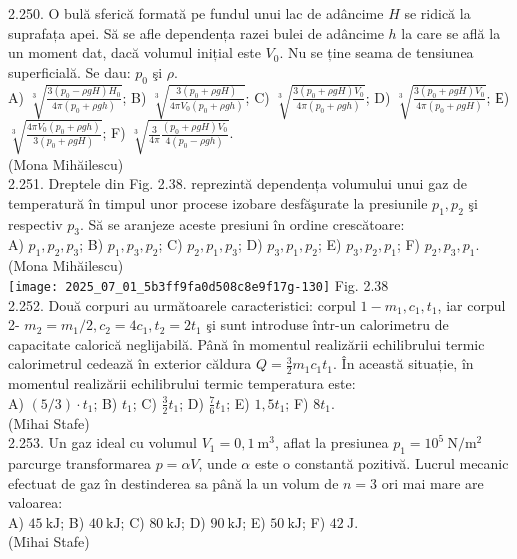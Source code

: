 2.250. O bulă sferică formată pe fundul unui lac de adâncime $H$ se ridică la suprafața apei. Să se afle dependența razei bulei de adâncime $h$ la care se află la un moment dat, dacă volumul inițial este $V_{0}$. Nu se ține seama de tensiunea superficială. Se dau: $p_{0}$ şi $\rho$.\\ A) $\sqrt[3]{\frac{3\left(p_{0}-\rho g H\right) H_{0}}{4 \pi\left(p_{0}+\rho g h\right)}}$; B) $\sqrt[3]{\frac{3\left(p_{0}+\rho g H\right)}{4 \pi V_{0}\left(p_{0}+\rho g h\right)}}$; C) $\sqrt[3]{\frac{3\left(p_{0}+\rho g H\right) V_{0}}{4 \pi\left(p_{0}+\rho g h\right)}}$; D) $\sqrt[3]{\frac{3\left(p_{0}+\rho g H\right) V_{0}}{4 \pi\left(p_{0}+\rho g H\right)}}$; Е) $\sqrt[3]{\frac{4 \pi V_{0}\left(p_{0}+\rho g h\right)}{3\left(p_{0}+\rho g H\right)}}$; F) $\sqrt[3]{\frac{3}{4 \pi} \frac{\left(p_{0}+\rho g H\right) V_{0}}{4\left(p_{0}-\rho g h\right)}}$.\\ (Mona Mihăilescu)\\

2.251. Dreptele din Fig. 2.38. reprezintă dependența volumului unui gaz de temperatură în timpul unor procese izobare desfăşurate la presiunile $p_{1}, p_{2}$ şi respectiv $p_{3}$. Să se aranjeze aceste presiuni în ordine crescătoare:\\ A) $p_{1}, p_{2}, p_{3}$; B) $p_{1}, p_{3}, p_{2}$; C) $p_{2}, p_{1}, p_{3}$; D) $p_{3}, p_{1}, p_{2}$; E) $p_{3}, p_{2}, p_{1}$; F) $p_{2}, p_{3}, p_{1}$.\\ (Mona Mihăilescu)\\ \texttt{[image: 2025\_07\_01\_5b3ff9fa0d508c8e9f17g-130]} Fig. 2.38\\

2.252. Două corpuri au următoarele caracteristici: corpul $1-m_{1}, c_{1}, t_{1}$, iar corpul 2- $m_{2}=m_{1} / 2, c_{2}=4 c_{1}, t_{2}=2 t_{1}$ şi sunt introduse într-un calorimetru de capacitate calorică neglijabilă. Până în momentul realizării echilibrului termic calorimetrul cedează în exterior căldura $Q=\frac{3}{2} m_{1} c_{1} t_{1}$. În această situație, în momentul realizării echilibrului termic temperatura este:\\ A) $(5 / 3) \cdot t_{1}$; B) $t_{1}$; C) $\frac{3}{2} t_{1}$; D) $\frac{7}{6} t_{1}$; E) $1,5 t_{1}$; F) $8 t_{1}$.\\ (Mihai Stafe)\\

2.253. Un gaz ideal cu volumul $V_{1}=0,1 \mathrm{~m}^{3}$, aflat la presiunea $p_{1}=10^{5} \mathrm{~N} / \mathrm{m}^{2}$ parcurge transformarea $p=\alpha V$, unde $\alpha$ este o constantă pozitivă. Lucrul mecanic efectuat de gaz în destinderea sa până la un volum de $n=3$ ori mai mare are valoarea:\\ A) $45 \mathrm{~kJ}$; B) $40 \mathrm{~kJ}$; C) $80 \mathrm{~kJ}$; D) $90 \mathrm{~kJ}$; E) $50 \mathrm{~kJ}$; F) $42 \mathrm{~J}$.\\ (Mihai Stafe)\\


